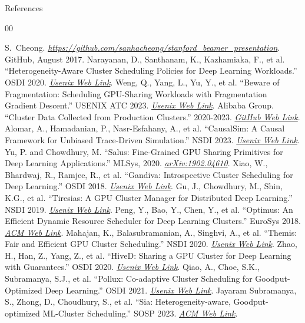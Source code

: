 \documentclass[pdf]{beamer}
\newcommand{\empr}[1]{{\color{cardinalred}\emph{#1}}}
\theoremstyle{remark}
\theoremstyle{definition}
\begin{document}
\begin{frame}[allowframebreaks]{References}
\begin{thebibliography}{00}
\begin{tiny}
	S.~Cheong. \empr{\href{https://github.com/sanhacheong/stanford_beamer_template}{https://github.com/sanhacheong/stanford\_beamer\_presentation}}. {GitHub}, August 2017.
     Narayanan, D., Santhanam, K., Kazhamiaka, F., et al. ``Heterogeneity-Aware Cluster Scheduling Policies for Deep Learning Workloads.'' OSDI 2020. \empr{\href{https://www.usenix.org/conference/osdi20/presentation/narayanan-deepak}{Usenix Web Link}}.
     Weng, Q., Yang, L., Yu, Y., et al. ``Beware of Fragmentation: Scheduling GPU-Sharing Workloads with Fragmentation Gradient Descent.'' USENIX ATC 2023. \empr{\href{https://www.usenix.org/conference/atc23/presentation/weng}{Usenix Web Link}}.
     Alibaba Group. ``Cluster Data Collected from Production Clusters.'' 2020-2023. \empr{\href{https://github.com/alibaba/clusterdata}{GitHub Web Link}}.
     Alomar, A., Hamadanian, P., Nasr-Esfahany, A., et al. ``CausalSim: A Causal Framework for Unbiased Trace-Driven Simulation.'' NSDI 2023. \empr{\href{https://www.usenix.org/conference/nsdi23/presentation/alomar}{Usenix Web Link}}.
     Yu, P. and Chowdhury, M. ``Salus: Fine-Grained GPU Sharing Primitives for Deep Learning Applications.'' MLSys, 2020. \empr{\href{https://arxiv.org/abs/1902.04610}{arXiv:1902.04610}}.
     Xiao, W., Bhardwaj, R., Ramjee, R., et al. ``Gandiva: Introspective Cluster Scheduling for Deep Learning.'' OSDI 2018. \empr{\href{https://www.usenix.org/conference/osdi18/presentation/xiao}{Usenix Web Link}}.
     Gu, J., Chowdhury, M., Shin, K.G., et al. ``Tiresias: A GPU Cluster Manager for Distributed Deep Learning.'' NSDI 2019. \empr{\href{https://www.usenix.org/conference/nsdi19/presentation/gu}{Usenix Web Link}}.
     Peng, Y., Bao, Y., Chen, Y., et al. ``Optimus: An Efficient Dynamic Resource Scheduler for Deep Learning Clusters.'' EuroSys 2018. \empr{\href{https://dl.acm.org/doi/10.1145/3190508.3190517}{ACM Web Link}}.
     Mahajan, K., Balasubramanian, A., Singhvi, A., et al. ``Themis: Fair and Efficient GPU Cluster Scheduling.'' NSDI 2020. \empr{\href{https://www.usenix.org/conference/nsdi20/presentation/mahajan}{Usenix Web Link}}.
     Zhao, H., Han, Z., Yang, Z., et al. ``HiveD: Sharing a GPU Cluster for Deep Learning with Guarantees.'' OSDI 2020. \empr{\href{https://www.usenix.org/conference/osdi20/presentation/zhao-hanyu}{Usenix Web Link}}.
     Qiao, A., Choe, S.K., Subramanya, S.J., et al. ``Pollux: Co-adaptive Cluster Scheduling for Goodput-Optimized Deep Learning.'' OSDI 2021. \empr{\href{https://www.usenix.org/conference/osdi21/presentation/qiao}{Usenix Web Link}}.
     Jayaram Subramanya, S., Zhong, D., Choudhury, S., et al. ``Sia: Heterogeneity-aware, Goodput-optimized ML-Cluster Scheduling.'' SOSP 2023. \empr{\href{https://dl.acm.org/doi/10.1145/3600006.3613175}{ACM Web Link}}.
\end{tiny}
\end{thebibliography}
\end{frame}
\end{document}
